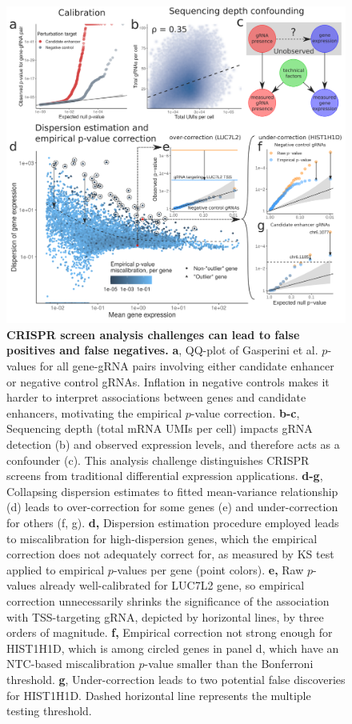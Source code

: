 \documentclass{nature}
\begin{document}
\addtocounter{page}{-1}
\thispagestyle{empty} 
\begin{figure}[h!]
	\includegraphics[width = \textwidth]{figures/Figure1/Figure1.png}
	\caption{\textbf{CRISPR screen analysis challenges can lead to false positives and false negatives.} \textbf{a}, QQ-plot of Gasperini et al. $p$-values for all gene-gRNA pairs involving either candidate enhancer or negative control gRNAs. Inflation in negative controls makes it harder to interpret associations between genes and candidate enhancers, motivating the empirical $p$-value correction. \textbf{b-c}, Sequencing depth (total mRNA UMIs per cell) impacts gRNA detection (b) and observed expression levels, and therefore acts as a confounder (c). This analysis challenge distinguishes CRISPR screens from traditional differential expression applications. \textbf{d-g}, Collapsing dispersion estimates to fitted mean-variance relationship (d) leads to over-correction for some genes (e) and under-correction for others (f, g). \textbf{d,} Dispersion estimation procedure employed leads to miscalibration for high-dispersion genes, which the empirical correction does not adequately correct for, as measured by KS test applied to empirical $p$-values per gene (point colors). \textbf{e,} Raw $p$-values already well-calibrated for LUC7L2 gene, so empirical correction unnecessarily shrinks the significance of the association with TSS-targeting gRNA, depicted by horizontal lines, by three orders of magnitude. \textbf{f,} Empirical correction not strong enough for HIST1H1D, which is among circled genes in panel d, which have an NTC-based miscalibration $p$-value smaller than the Bonferroni threshold. \textbf{g}, Under-correction leads to two potential false discoveries for HIST1H1D. Dashed horizontal line represents the multiple testing threshold.}
	\label{fig:analysis-challenges}
\end{figure}
\end{document}
